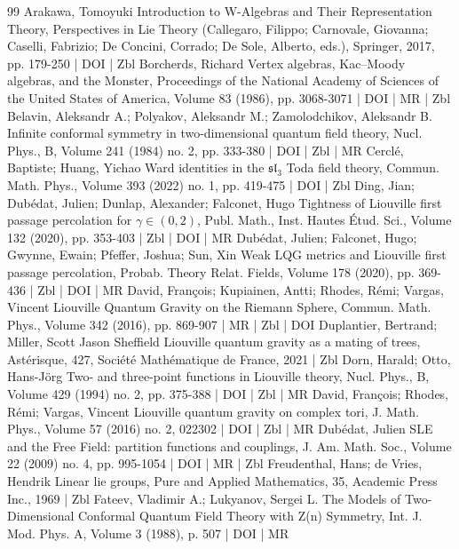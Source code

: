 \begin{thebibliography}{99}
Arakawa, Tomoyuki Introduction to W-Algebras and Their Representation Theory, Perspectives in Lie Theory (Callegaro, Filippo; Carnovale, Giovanna; Caselli, Fabrizio; De Concini, Corrado; De Sole, Alberto, eds.), Springer, 2017, pp. 179-250 | DOI | Zbl
Borcherds, Richard Vertex algebras, Kac–Moody algebras, and the Monster, Proceedings of the National Academy of Sciences of the United States of America, Volume 83 (1986), pp. 3068-3071 | DOI | MR | Zbl
Belavin, Aleksandr A.; Polyakov, Aleksandr M.; Zamolodchikov, Aleksandr B. Infinite conformal symmetry in two-dimensional quantum field theory, Nucl. Phys., B, Volume 241 (1984) no. 2, pp. 333-380 | DOI | Zbl | MR
Cerclé, Baptiste; Huang, Yichao Ward identities in the $\mathfrak{sl}_3$ Toda field theory, Commun. Math. Phys., Volume 393 (2022) no. 1, pp. 419-475 | DOI | Zbl
Ding, Jian; Dubédat, Julien; Dunlap, Alexander; Falconet, Hugo Tightness of Liouville first passage percolation for $\gamma \in (0,2)$, Publ. Math., Inst. Hautes Étud. Sci., Volume 132 (2020), pp. 353-403 | Zbl | DOI | MR
Dubédat, Julien; Falconet, Hugo; Gwynne, Ewain; Pfeffer, Joshua; Sun, Xin Weak LQG metrics and Liouville first passage percolation, Probab. Theory Relat. Fields, Volume 178 (2020), pp. 369-436 | Zbl | DOI | MR
David, François; Kupiainen, Antti; Rhodes, Rémi; Vargas, Vincent Liouville Quantum Gravity on the Riemann Sphere, Commun. Math. Phys., Volume 342 (2016), pp. 869-907 | MR | Zbl | DOI
Duplantier, Bertrand; Miller, Scott Jason Sheffield Liouville quantum gravity as a mating of trees, Astérisque, 427, Société Mathématique de France, 2021 | Zbl
Dorn, Harald; Otto, Hans-Jörg Two- and three-point functions in Liouville theory, Nucl. Phys., B, Volume 429 (1994) no. 2, pp. 375-388 | DOI | Zbl | MR
David, François; Rhodes, Rémi; Vargas, Vincent Liouville quantum gravity on complex tori, J. Math. Phys., Volume 57 (2016) no. 2, 022302 | DOI | Zbl | MR
Dubédat, Julien SLE and the Free Field: partition functions and couplings, J. Am. Math. Soc., Volume 22 (2009) no. 4, pp. 995-1054 | DOI | MR | Zbl
Freudenthal, Hans; de Vries, Hendrik Linear lie groups, Pure and Applied Mathematics, 35, Academic Press Inc., 1969 | Zbl
Fateev, Vladimir A.; Lukyanov, Sergei L. The Models of Two-Dimensional Conformal Quantum Field Theory with Z(n) Symmetry, Int. J. Mod. Phys. A, Volume 3 (1988), p. 507 | DOI | MR

\end{thebibliography}

